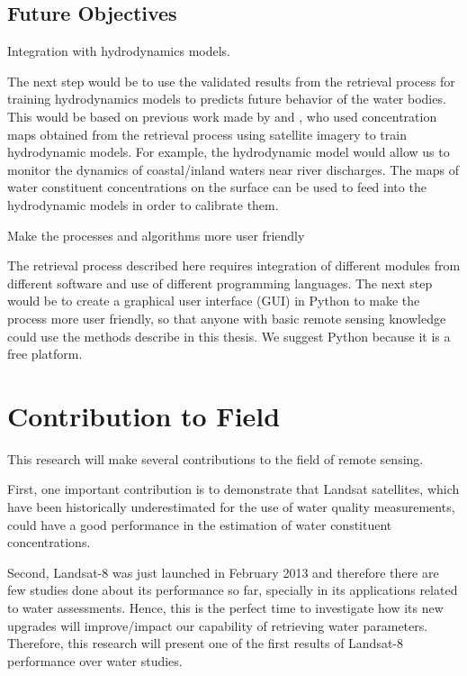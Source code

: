 \subsection{Future Objectives}
	\begin{enumerate}
			{\bf \item Integration with hydrodynamics models.  } 

The next step would be to use the validated results from the retrieval process for training hydrodynamics models to predicts future behavior of the water bodies. This would be based on previous work made by \cite{Pahlevan:2012} and \cite{GeraceThesis}, who used concentration maps obtained from the retrieval process using satellite imagery to train hydrodynamic models. For example, the hydrodynamic model would allow us to monitor the dynamics of coastal/inland waters near river discharges. The maps of water constituent concentrations on the surface can be used to feed into the hydrodynamic models in order to calibrate them. 

			{\bf \item Make the processes and algorithms more user friendly} 

The retrieval process described here requires integration of different modules from different software and use of different programming languages. The next step would be to create a graphical user interface (GUI) in Python to make the process more user friendly, so that anyone with basic remote sensing knowledge could use the methods describe in this thesis. We suggest Python because it is a free platform.

	\end{enumerate}	

		

\section{Contribution to Field}
\label{sec:contributiontofield}
This research will make several contributions to the field of remote sensing.

First, one important contribution is to demonstrate that Landsat satellites, which have been historically underestimated for the use of water quality measurements, could have a good performance in the estimation of water constituent concentrations.

Second, Landsat-8 was just launched in February 2013 and therefore there are few studies done about its performance so far, specially in its applications related to water assessments. Hence, this is the perfect time to investigate how its new upgrades will improve/impact our capability of retrieving water parameters. Therefore, this research will present one of the first results of Landsat-8 performance over water studies.  

